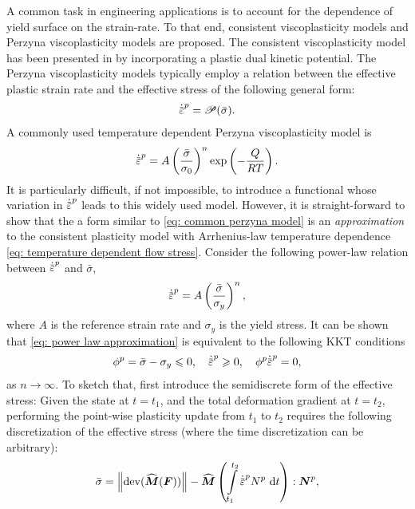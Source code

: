 A common task in engineering applications is to account for the dependence of yield surface on the strain-rate. To that end, consistent viscoplasticity models and Perzyna viscoplasticity models are proposed. The consistent viscoplasticity model has been presented in  by incorporating a plastic dual kinetic potential. The Perzyna viscoplasticity models typically employ a relation between the effective plastic strain rate and the effective stress of the following general form:
\begin{align}
  \epdot = \mathscr{P}(\bar{\sigma}).
\end{align}
A commonly used temperature dependent Perzyna viscoplasticity model is
\begin{align}
  \epdot = A\left( \dfrac{\bar{\sigma}}{\sigma_0} \right)^n\exp\left( -\dfrac{Q}{RT} \right). \label{eq: common perzyna model}
\end{align}
It is particularly difficult, if not impossible, to introduce a functional whose variation in $\epdot$ leads to this widely used model. However, it is straight-forward to show that the a form similar to \eqref{eq: common perzyna model} is an \emph{approximation} to the consistent plasticity model with Arrhenius-law temperature dependence \eqref{eq: temperature dependent flow stress}. Consider the following power-law relation between $\epdot$ and $\bar{\sigma}$,
\begin{align}
  \epdot = A\left( \dfrac{\bar{\sigma}}{\sigma_y} \right)^n, \label{eq: power law approximation}
\end{align}
where $A$ is the reference strain rate and $\sigma_y$ is the yield stress. It can be shown that \eqref{eq: power law approximation} is equivalent to the following KKT conditions
\begin{align}
  \phi^p = \bar{\sigma} - \sigma_y \leqslant 0, \quad \epdot \geqslant 0, \quad \phi^p\epdot = 0, \label{eq: consistent KKT}
\end{align}
as $n \to \infty$. To sketch that, first introduce the semidiscrete form of the effective stress: Given the state at $t = t_1$, and the total deformation gradient at $t = t_2$, performing the point-wise plasticity update from $t_1$ to $t_2$ requires the following discretization of the effective stress (where the time discretization can be arbitrary):
\begin{align}
  \bar{\sigma} = \norm{\dev(\widehat{\bfM}(\defgrad))} - \widehat{\bfM}\left( \int\limits_{t_1}^{t_2} \epdot N^p \diff{t} \right) : \bfN^p, \label{eq: semidiscrete yield surface}
\end{align}
